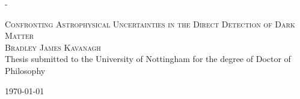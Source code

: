 \calccentering{\unitlength}                         %
\begin{adjustwidth*}{\unitlength}{-\unitlength}     %
    \begin{adjustwidth}{-1cm}{-1cm}                 %
      \begin{titlingpage}
      \begin{center}


      \textsc{\LARGE Confronting Astrophysical Uncertainties in the Direct Detection of Dark Matter}\\[1.5cm]

      \textsc{\Large Bradley James Kavanagh}\\[0.5cm]


      Thesis submitted to the University of Nottingham for the degree of Doctor of Philosophy

      \vfill

      {\large \today}

      \end{center}
      \end{titlingpage}
    \end{adjustwidth}
\end{adjustwidth*}
